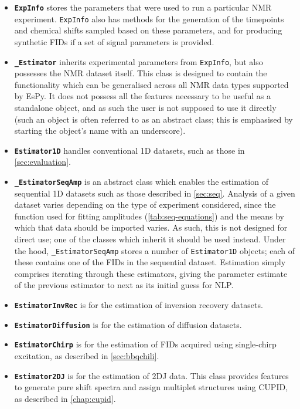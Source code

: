 \begin{itemize}
    \item \textbf{\textbf{\texttt{ExpInfo}}} stores the parameters that were
        used to run a particular \ac{NMR} experiment. \texttt{ExpInfo} also has
        methods for the generation of the timepoints and chemical shifts sampled
        based on these parameters, and for producing synthetic \acp{FID} if a
        set of signal parameters is provided.
    \item \textbf{\texttt{\_Estimator}} inherits experimental parameters from
        \texttt{ExpInfo}, but also possesses the \ac{NMR} dataset itself.
        This class is designed to contain the functionality which can be
        generalised across all \ac{NMR} data types supported by \ac{EsPy}. It
        does not possess all the features necessary to be useful as a standalone
        object, and as such the user is not supposed to use it directly (such
        an object is often referred to as an abstract class; this is emphasised
        by starting the object's name with an underscore).
    \item \textbf{\texttt{Estimator1D}} handles conventional \ac{1D} datasets,
        such as those in \cref{sec:evaluation}.
    \item \textbf{\texttt{\_EstimatorSeqAmp}} is an abstract class
        which enables the estimation of sequential \ac{1D} datasets such as those
        described in \cref{sec:seq}. Analysis of a given dataset varies depending on
        the type of experiment considered, since the function used for
        fitting amplitudes (\cref{tab:seq-equations}) and the means by
        which that data should be imported varies. As such, this is not
        designed for direct use; one of the classes which inherit it should be
        used instead. Under the hood, \texttt{\_EstimatorSeqAmp} stores a
        number of \texttt{Estimator1D} objects; each of these contains one
        of the \acp{FID} in the sequential dataset. Estimation simply comprises
        iterating through these estimators, giving the parameter estimate of
        the previous estimator to next as its initial guess for \ac{NLP}.
    \item \textbf{\texttt{EstimatorInvRec}} is for the estimation of inversion
        recovery datasets.
    \item \textbf{\texttt{EstimatorDiffusion}} is for the estimation of
        diffusion datasets.
    \item \textbf{\texttt{EstimatorChirp}} is for the estimation of \acp{FID}
        acquired using single-chirp excitation, as described in \cref{sec:bbqchili}.
    \item \textbf{\texttt{Estimator2DJ}} is for the estimation of \ac{2DJ} data.
        This class provides features to generate pure shift spectra and
        assign multiplet structures using \ac{CUPID}, as described in
        \cref{chap:cupid}.
\end{itemize}

